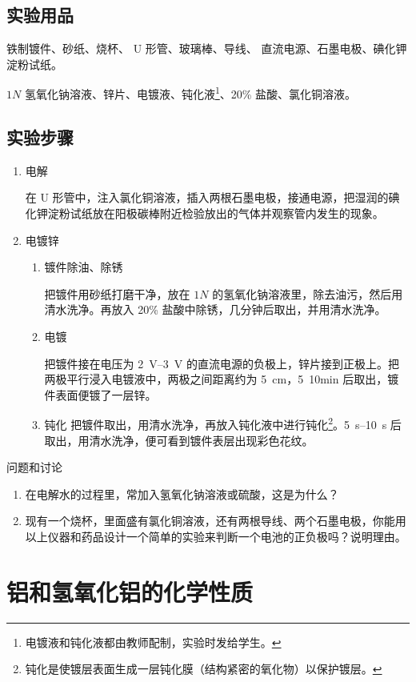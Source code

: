 \subsection*{实验用品}
铁制镀件、砂纸、烧杯、 U 形管、玻璃棒、导线、 直流电源、石墨电极、碘化钾淀粉试纸。

$1N$ 氢氧化钠溶液、锌片、电镀液、钝化液\footnote{电镀液和钝化液都由教师配制，实验时发给学生。}、20\% 盐酸、氯化铜溶液。

\subsection*{实验步骤}
\begin{enumerate}[1.]
  \item 电解
  
  在 U 形管中，注入氯化铜溶液，插入两根石墨电极，接通电源，把湿润的碘化钾淀粉试纸放在阳极碳棒附近检验放出的气体并观察管内发生的现象。
  \item 电镀锌
  \begin{enumerate}[(1)]
    \item 镀件除油、除锈
    
    把镀件用砂纸打磨干净，放在 $1N$ 的氢氧化钠溶液里，除去油污，然后用清水洗净。再放入 20\% 盐酸中除锈，几分钟后取出，并用清水洗净。
    \item 电镀
    
    把镀件接在电压为 \qtyrange{2}{3}{V} 的直流电源的负极上，锌片接到正极上。把两极平行浸入电镀液中，两极之间距离约为 \qty{5}{cm}，\qty{5}{10}{min} 后取出，镀件表面便镀了一层锌。
    \item 钝化
    把镀件取出，用清水洗净，再放入钝化液中进行钝化\footnote{钝化是使镀层表面生成一层钝化膜（结构紧密的氧化物）以保护镀层。}。\qtyrange{5}{10}{s} 后取出，用清水洗净，便可看到镀件表层出现彩色花纹。
  \end{enumerate}
\end{enumerate}
\begin{Theorem}{问题和讨论}
\begin{enumerate}[1.]
  \item 在电解水的过程里，常加入氢氧化钠溶液或硫酸，这是为什么？
  \item 现有一个烧杯，里面盛有氯化铜溶液，还有两根导线、两个石墨电极，你能用以上仪器和药品设计一个简单的实验来判断一个电池的正负极吗？说明理由。
\end{enumerate}
\end{Theorem}


\section{铝和氢氧化铝的化学性质}
